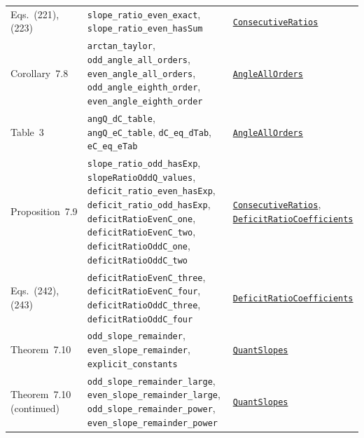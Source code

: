 \documentclass[11pt,a4paper]{article}
\newcommand{\R}{https://github.com/ralfanop/Certifications_Eulerian_polar-curve_computations}
\newcommand{\A}{\R/blob/main/certifications/manuscript15}
\begin{document}
{\begin{longtable}{@{}>{\raggedright\arraybackslash}p{}>{\raggedright\arraybackslash}p{}>{\raggedright\arraybackslash}p{}@{}}
Eqs.~(221), (223) & \texttt{slope\_\allowbreak ratio\_\allowbreak even\_\allowbreak exact}, \texttt{slope\_\allowbreak ratio\_\allowbreak even\_\allowbreak hasSum} & \href{\A/LEAN/PrivateApex/ConsecutiveRatios.lean}{\texttt{ConsecutiveRatios}}\\
Corollary~7.8 & \texttt{arctan\_\allowbreak taylor}, \texttt{odd\_\allowbreak angle\_\allowbreak all\_\allowbreak orders}, \texttt{even\_\allowbreak angle\_\allowbreak all\_\allowbreak orders}, \texttt{odd\_\allowbreak angle\_\allowbreak eighth\_\allowbreak order}, \texttt{even\_\allowbreak angle\_\allowbreak eighth\_\allowbreak order} & \href{\A/LEAN/PrivateApex/AngleAllOrders.lean}{\texttt{AngleAllOrders}}\\
Table~3 & \texttt{angQ\_\allowbreak dC\_\allowbreak table}, \texttt{angQ\_\allowbreak eC\_\allowbreak table}, \texttt{dC\_\allowbreak eq\_\allowbreak dTab}, \texttt{eC\_\allowbreak eq\_\allowbreak eTab} & \href{\A/LEAN/PrivateApex/AngleAllOrders.lean}{\texttt{AngleAllOrders}}\\
Proposition~7.9 & \texttt{slope\_\allowbreak ratio\_\allowbreak odd\_\allowbreak hasExp}, \texttt{slopeRatioOddQ\_\allowbreak values}, \texttt{deficit\_\allowbreak ratio\_\allowbreak even\_\allowbreak hasExp}, \texttt{deficit\_\allowbreak ratio\_\allowbreak odd\_\allowbreak hasExp}, \texttt{deficitRatioEvenC\_\allowbreak one}, \texttt{deficitRatioEvenC\_\allowbreak two}, \texttt{deficitRatioOddC\_\allowbreak one}, \texttt{deficitRatioOddC\_\allowbreak two} & \href{\A/LEAN/PrivateApex/ConsecutiveRatios.lean}{\texttt{ConsecutiveRatios}}, \href{\A/LEAN/PrivateApex/DeficitRatioCoefficients.lean}{\texttt{DeficitRatioCoefficients}}\\
Eqs.~(242), (243) & \texttt{deficitRatioEvenC\_\allowbreak three}, \texttt{deficitRatioEvenC\_\allowbreak four}, \texttt{deficitRatioOddC\_\allowbreak three}, \texttt{deficitRatioOddC\_\allowbreak four} & \href{\A/LEAN/PrivateApex/DeficitRatioCoefficients.lean}{\texttt{DeficitRatioCoefficients}}\\
Theorem~7.10 & \texttt{odd\_\allowbreak slope\_\allowbreak remainder}, \texttt{even\_\allowbreak slope\_\allowbreak remainder}, \texttt{explicit\_\allowbreak constants} & \href{\A/LEAN/PrivateApex/QuantSlopes.lean}{\texttt{QuantSlopes}}\\
Theorem~7.10 (continued) & \texttt{odd\_\allowbreak slope\_\allowbreak remainder\_\allowbreak large}, \texttt{even\_\allowbreak slope\_\allowbreak remainder\_\allowbreak large}, \texttt{odd\_\allowbreak slope\_\allowbreak remainder\_\allowbreak power}, \texttt{even\_\allowbreak slope\_\allowbreak remainder\_\allowbreak power} & \href{\A/LEAN/PrivateApex/QuantSlopes.lean}{\texttt{QuantSlopes}}\\

\end{longtable}}
\end{document}
